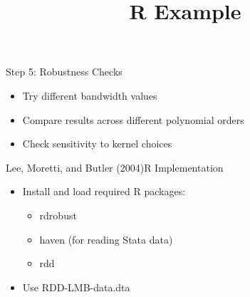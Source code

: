 \documentclass[dvipsnames,hyperref={pdfpagelabels=false}]{beamer}
\begin{document}
\begin{frame}{Step 5: Robustness Checks}
	\begin{itemize}

			\item Try different bandwidth values
					\vspace{0.2cm}
			\item Compare results across different polynomial orders
					\vspace{0.2cm}
			\item Check sensitivity to kernel choices
		\end{itemize}

\end{frame}




\title[]  
{R Example}


\author 
{}

\institute{}






\date
{}


\begin{frame}{}
	\titlepage
\end{frame}



\begin{frame}{Lee, Moretti, and Butler (2004)}{R Implementation}
	\begin{itemize}
		\item Install and load required R packages:
		\begin{itemize}
			\item rdrobust
			\item haven (for reading Stata data)
			\item rdd
		\end{itemize}
		\vspace{0.2cm}
		\item Use RDD-LMB-data.dta
	\end{itemize}
\end{frame}
\end{document}
